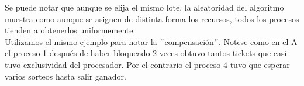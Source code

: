 Se puede notar que aunque se elija el mismo lote, la aleatoridad del algoritmo muestra como aunque se asignen de distinta forma los recursos, todos los procesos
tienden a obtenerlos uniformemente.\\
Utilizamos el mismo ejemplo para notar la $"$compensación$"$. Notese como en el A el proceso 1 después de haber bloqueado 2 veces obtuvo tantos tickets que casi tuvo
exclusividad del procesador. Por el contrario el proceso 4 tuvo que esperar varios sorteos hasta salir ganador.
